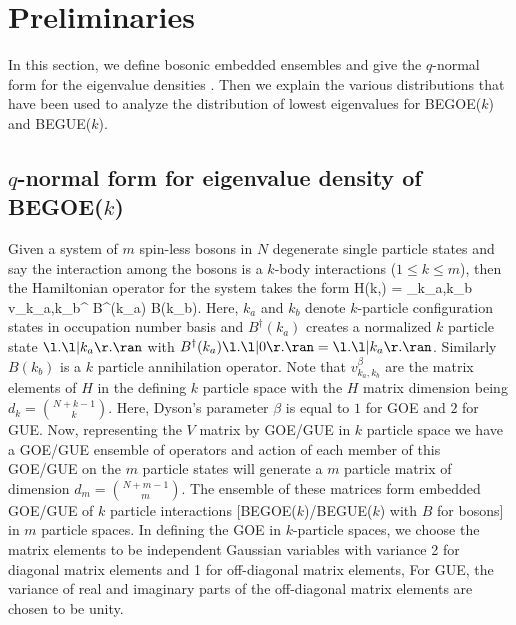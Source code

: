 \section{Preliminaries}
\label{sec1}

In this section, we define bosonic embedded ensembles and give the $q$-normal form for the eigenvalue densities \cite{JSM-2019}. Then we explain the various distributions that have been used to analyze the distribution of  lowest eigenvalues for BEGOE($k$) and BEGUE($k$). 

\subsection{$q$-normal form for eigenvalue density of BEGOE($k$)}

Given a system of $m$ spin-less bosons in $N$ degenerate single particle states and say the interaction among the bosons is a $k$-body interactions ($1 \leq k \leq m$),  then the Hamiltonian operator for the system takes the form 
\be
H(k,\beta) = \dis\sum_{k_a,k_b} v_{k_a,k_b}^{\beta} B^\dagger(k_a) B(k_b)\;.
\label{eq.ent1}
\ee
Here, $k_a$ and $k_b$ denote $k$-particle configuration states in occupation number basis and 
$B^\dagger(k_a)$ creates a normalized $k$ particle state $\l.\l|k_a\r.\ran$ with $B^\dagger(k_a)\l.\l|0\r.\ran=\l.\l|k_a\r.\ran$. Similarly $B(k_b)$ is a $k$ particle annihilation operator.  Note that $v_{k_a,k_b}^{\beta}$ are the matrix elements of $H$ in the defining $k$ particle space with the $H$ matrix dimension being $d_k={N+k-1 \choose k}$.  Here,  Dyson's parameter $\beta$ is equal to $1$ for GOE and $2$ for GUE.  Now, representing the $V$ matrix by GOE/GUE in $k$ particle space we have a GOE/GUE ensemble of operators and action of each member of this GOE/GUE on the $m$ particle states will generate a $m$ particle matrix of dimension $d_m={N+m-1 \choose m}$. The ensemble of these matrices form embedded GOE/GUE of $k$ particle interactions [BEGOE($k$)/BEGUE($k$) with $B$ for bosons] in $m$ particle spaces.  In defining the GOE in $k$-particle spaces, we choose the matrix elements to be independent Gaussian variables with variance 2 for diagonal matrix elements and 1 for off-diagonal matrix elements, For GUE, the variance of real and imaginary parts of the off-diagonal matrix elements are chosen to be unity.

